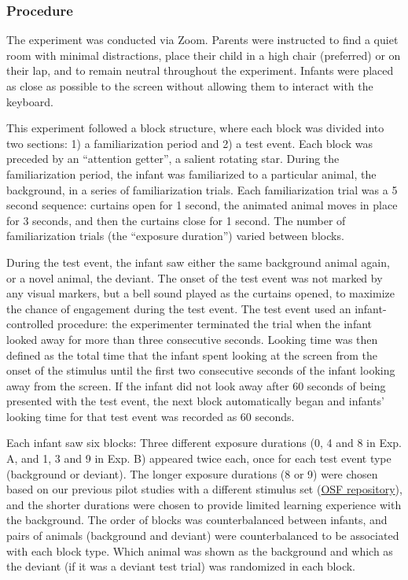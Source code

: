 \documentclass[10pt, letterpaper]{article}
\begin{document}
\hypertarget{procedure-1}{%
\subsubsection{Procedure}\label{procedure-1}}

The experiment was conducted via Zoom. Parents were instructed to find a
quiet room with minimal distractions, place their child in a high chair
(preferred) or on their lap, and to remain neutral throughout the
experiment. Infants were placed as close as possible to the screen
without allowing them to interact with the keyboard.

This experiment followed a block structure, where each block was divided
into two sections: 1) a familiarization period and 2) a test event. Each
block was preceded by an ``attention getter'', a salient rotating star.
During the familiarization period, the infant was familiarized to a
particular animal, the background, in a series of familiarization
trials. Each familiarization trial was a 5 second sequence: curtains
open for 1 second, the animated animal moves in place for 3 seconds, and
then the curtains close for 1 second. The number of familiarization
trials (the ``exposure duration'') varied between blocks.

During the test event, the infant saw either the same background animal
again, or a novel animal, the deviant. The onset of the test event was
not marked by any visual markers, but a bell sound played as the
curtains opened, to maximize the chance of engagement during the test
event. The test event used an infant-controlled procedure: the
experimenter terminated the trial when the infant looked away for more
than three consecutive seconds. Looking time was then defined as the
total time that the infant spent looking at the screen from the onset of
the stimulus until the first two consecutive seconds of the infant
looking away from the screen. If the infant did not look away after 60
seconds of being presented with the test event, the next block
automatically began and infants' looking time for that test event was
recorded as 60 seconds.

Each infant saw six blocks: Three different exposure durations (0, 4 and
8 in Exp. A, and 1, 3 and 9 in Exp. B) appeared twice each, once for
each test event type (background or deviant). The longer exposure
durations (8 or 9) were chosen based on our previous pilot studies with
a different stimulus set
(\href{https://osf.io/b3xsk/?view_only=5beeb6ed27874ae3bfe586ee2b38381a}{OSF
repository}), and the shorter durations were chosen to provide limited
learning experience with the background. The order of blocks was
counterbalanced between infants, and pairs of animals (background and
deviant) were counterbalanced to be associated with each block type.
Which animal was shown as the background and which as the deviant (if it
was a deviant test trial) was randomized in each block.
\end{document}
